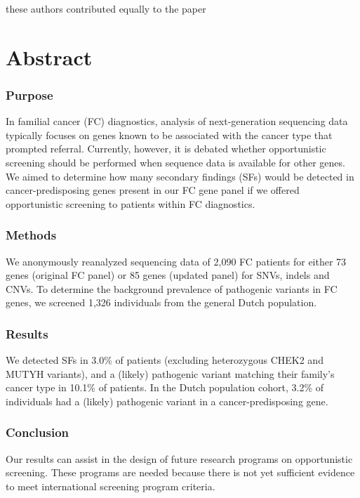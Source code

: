 \noindent* these authors contributed equally to the paper


\section*{Abstract}\label{abstract}
\subsubsection{Purpose}
In familial cancer (FC) diagnostics, analysis of next-generation sequencing data typically focuses on genes known to be associated with the cancer type that prompted referral. Currently, however, it is debated whether opportunistic screening should be performed when sequence data is available for other genes. We aimed to determine how many secondary findings (SFs) would be detected in cancer-predisposing genes present in our FC gene panel if we offered opportunistic screening to patients within FC diagnostics.
\subsubsection{Methods}
We anonymously reanalyzed sequencing data of 2,090 FC patients for either 73 genes (original FC panel) or 85 genes (updated panel) for SNVs, indels and CNVs. To determine the background prevalence of pathogenic variants in FC genes, we screened 1,326 individuals from the general Dutch population.
\subsubsection{Results}
We detected SFs in 3.0\% of patients (excluding heterozygous CHEK2 and MUTYH variants), and a (likely) pathogenic variant matching their family’s cancer type in 10.1\% of patients. In the Dutch population cohort, 3.2\% of individuals had a (likely) pathogenic variant in a cancer-predisposing gene. 
\subsubsection{Conclusion}
Our results can assist in the design of future research programs on opportunistic screening. These programs are needed because there is not yet sufficient evidence to meet international screening program criteria. 

